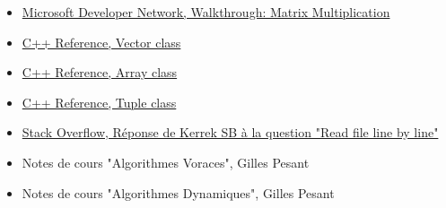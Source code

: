 \documentclass[10pt,a4paper]{article}
\begin{document}
\begin{itemize}
	\item \href{http://msdn.microsoft.com/en-us/library/hh873134.aspx}{Microsoft Developer Network, Walkthrough: Matrix Multiplication}
	\item \href{http://www.cplusplus.com/reference/vector/vector/}{C++ Reference, Vector class}
	\item \href{http://www.cplusplus.com/doc/tutorial/arrays/}{C++ Reference, Array class}
	\item \href{http://www.cplusplus.com/reference/tuple/tuple/}{C++ Reference, Tuple class}
	\item \href{http://stackoverflow.com/questions/7868936/c-read-file-line-by-line}{Stack Overflow, Réponse de Kerrek SB à la question "Read file line by line"}
	\item Notes de cours "Algorithmes Voraces", Gilles Pesant
	\item Notes de cours "Algorithmes Dynamiques", Gilles Pesant
\end{itemize}
\end{document}
